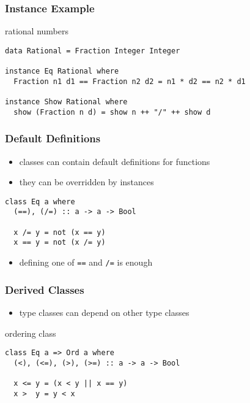 \documentclass[dvipsnames]{beamer}
\theoremstyle{plain}
\begin{document}
\begin{frame}[fragile]
  \frametitle{Instance Example}

  \begin{exampleblock}{rational numbers}
    \begin{lstlisting}
data Rational = Fraction Integer Integer

instance Eq Rational where
  Fraction n1 d1 == Fraction n2 d2 = n1 * d2 == n2 * d1

instance Show Rational where
  show (Fraction n d) = show n ++ "/" ++ show d
    \end{lstlisting}
  \end{exampleblock}
\end{frame}

\begin{frame}[fragile]
  \frametitle{Default Definitions}

  \begin{itemize}
    \item classes can contain default definitions for functions
    \item they can be overridden by instances
  \end{itemize}

  \begin{exampleblock}{}
    \begin{lstlisting}
class Eq a where
  (==), (/=) :: a -> a -> Bool

  x /= y = not (x == y)
  x == y = not (x /= y)
    \end{lstlisting}
  \end{exampleblock}

  \begin{itemize}
    \item defining one of \lstinline|==| and \lstinline|/=| is enough
  \end{itemize}
\end{frame}

\begin{frame}[fragile]
  \frametitle{Derived Classes}

  \begin{itemize}
    \item type classes can depend on other type classes
  \end{itemize}

  \begin{exampleblock}{ordering class}
    \begin{lstlisting}
class Eq a => Ord a where
  (<), (<=), (>), (>=) :: a -> a -> Bool

  x <= y = (x < y || x == y)
  x >  y = y < x
    \end{lstlisting}
  \end{exampleblock}
\end{frame}
\end{document}
